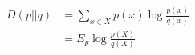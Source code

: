 \begin{align}
	D(p||q) & =  \sum_{x \in X} p(x) \log \frac{p(x)}{q(x)} \\
		  	& = E_p \log \frac{p(X)}{q(X)}
\end{align}